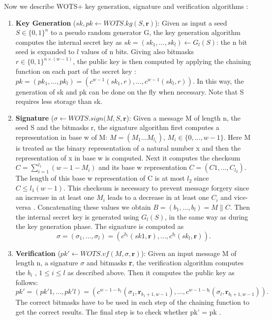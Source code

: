 \documentclass[a4paper,12pt]{article}
\begin{document}
Now we describe WOTS+ key generation, signature and verification algorithms \cite{1_sphincspaper}:

\begin{enumerate}
	\item \textbf{Key Generation} ($sk, pk \gets WOTS.kg(S, \textbf{r})$):
	Given as input a seed $S \in \{0, 1\}^{n}$ to a pseudo random generator G, the key generation algorithm computes the internal secret key as $sk = (sk_{1} , . . . , sk_{l}) \gets G_{l}(S)$: the n bit seed is expanded to $l$ values of n bits.
	Giving also bitmasks $r \in \{0, 1\}^{n \times (w-1)}$, the public key is then computed by applying the chaining function on each part of the secret key \cite{4_wings}: 
	$pk = (pk_{1} , . . . , pk_{l} ) = (c^{w-1}(sk_{1},r), . . . , c^{w-1}(sk_{l},r))$.
	In this way, the generation of sk and pk can be done on the fly when necessary. Note that S requires less storage than sk.
	\item \textbf{Signature} ($\sigma \gets WOTS.sign(M, S, \textbf{r}$): Given a message M of length n, the seed S and the bitmasks r, the signature algorithm first computes a representation in base w of M: $M = (M_{1} . . . M_{l_{1}})$, $M_{i} \in \{0, . . . , w - 1\}$. Here M is treated as the binary representation of a natural number x and then the representation of x in base w is computed.
	Next it computes the checksum $C=\displaystyle\sum_{i=1}^{l_{1}} (w - 1 - M_{i})$ and its base w representation $C = (C1 , ..., C_{l_{2}})$. The length of this base w representation of C is at most $l_{2}$ since $C \leq l_{1}(w - 1)$.
	This checksum is necessary to prevent message forgery since an increase in at least one $M_{i}$ leads to a decrease in at least one $C_{i}$ and vice-versa \cite{3_SPHINCS_secondpaper}.
	Concatenating these values we obtain $B = (b_{1} , . . . , b_{l} ) = M \parallel C$. Then the internal secret key is generated using $G_{l}(S)$, in the same way as during the key generation phase.
	The signature is computed as $$\sigma = (\sigma_{1} , . . . , \sigma_{l}) = (c^{b _{1}}(sk1, \textbf{r}),..., c^{b_{l}}(sk_{l}, \textbf{r})).$$
	\item \textbf{Verification} ($pk' \gets WOTS.vf(M, \sigma, \textbf{r})$): Given an input message M of length n, a signature $\sigma$ and bitmasks \textbf{r}, the verification algorithm computes the $b_{i}$ , $1 \leq i \leq l$ as described above. Then it computes the public key as follows:
	$$pk' = (pk'1, ..., pk'l ) = (c^{w-1-b_{1}}(\sigma_{1}, \textbf{r}_{b_{1}+1,w-1}), . . . , c^{w-1-b_{l}}(\sigma_{l},\textbf{r}_{b_{l}+1,w-1})).$$
	The correct bitmasks have to be used in each step of the chaining function to get the correct results. The final step is to check whether pk' = pk \cite{4_wings}.
\end{enumerate}
\end{document}
